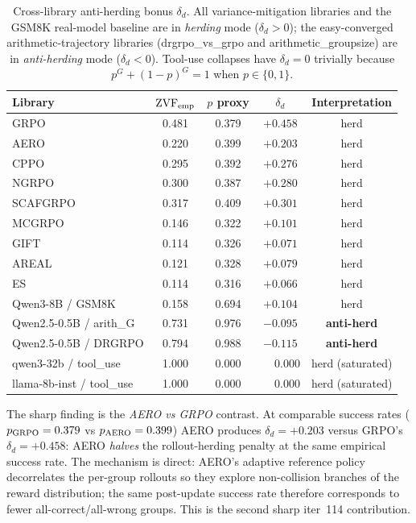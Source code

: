 \begin{table}[ht]\centering\small
\begin{tabular}{lcccc}
\toprule
Library & \(\mathrm{ZVF}_{\rm emp}\) & \(p\) proxy & \(\delta_{d}\) & Interpretation \\
\midrule
GRPO     & 0.481 & 0.379 & \(+0.458\) & herd \\
AERO     & 0.220 & 0.399 & \(+0.203\) & herd \\
CPPO     & 0.295 & 0.392 & \(+0.276\) & herd \\
NGRPO    & 0.300 & 0.387 & \(+0.280\) & herd \\
SCAFGRPO & 0.317 & 0.409 & \(+0.301\) & herd \\
MCGRPO   & 0.146 & 0.322 & \(+0.101\) & herd \\
GIFT     & 0.114 & 0.326 & \(+0.071\) & herd \\
AREAL    & 0.121 & 0.328 & \(+0.079\) & herd \\
ES       & 0.114 & 0.316 & \(+0.066\) & herd \\
Qwen3-8B / GSM8K & 0.158 & 0.694 & \(+0.104\) & herd \\
Qwen2.5-0.5B / arith\_G & 0.731 & 0.976 & \(\mathbf{-0.095}\) & \textbf{anti-herd} \\
Qwen2.5-0.5B / DRGRPO   & 0.794 & 0.988 & \(\mathbf{-0.115}\) & \textbf{anti-herd} \\
qwen3-32b / tool\_use   & 1.000 & 0.000 & \(\phantom{-}0.000\) & herd (saturated) \\
llama-8b-inst / tool\_use & 1.000 & 0.000 & \(\phantom{-}0.000\) & herd (saturated) \\
\bottomrule
\end{tabular}
\caption{Cross-library anti-herding bonus \(\delta_{d}\). All
variance-mitigation libraries and the GSM8K real-model baseline are
in \emph{herding} mode (\(\delta_{d}>0\)); the easy-converged
arithmetic-trajectory libraries (drgrpo\_vs\_grpo and
arithmetic\_groupsize) are in \emph{anti-herding} mode
(\(\delta_{d}<0\)). Tool-use collapses have \(\delta_{d}=0\) trivially
because \(p^{G}+(1-p)^{G}=1\) when \(p\in\{0,1\}\).}
\label{tab:zvf-delta-d}
\end{table}

\noindent The sharp finding is the \emph{AERO vs GRPO} contrast.
At comparable success rates (\(p_{\rm GRPO}=0.379\) vs
\(p_{\rm AERO}=0.399\)) AERO produces
\(\delta_{d}=+0.203\) versus GRPO's \(\delta_{d}=+0.458\): AERO
\emph{halves} the rollout-herding penalty at the same empirical
success rate. The mechanism is direct: AERO's adaptive reference
policy decorrelates the per-group rollouts so they explore
non-collision branches of the reward distribution; the same
post-update success rate therefore corresponds to fewer
all-correct/all-wrong groups. This is the second sharp iter~114
contribution.

